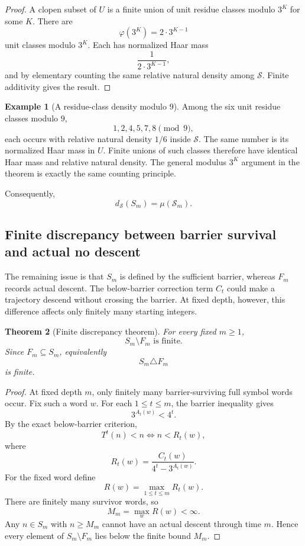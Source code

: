 \documentclass[11pt]{article}
\newtheorem{theorem}{Theorem}[section]
\theoremstyle{definition}
\newtheorem{example}[theorem]{Example}
\theoremstyle{remark}
\newcommand{\Sset}{\mathcal S}
\newcommand{\ds}{d_{\Sset}}
\begin{document}
\begin{proof}
A clopen subset of $U$ is a finite union of unit residue classes modulo $3^K$ for some $K$.  There are
\[
\varphi(3^K)=2\cdot3^{K-1}
\]
unit classes modulo $3^K$.  Each has normalized Haar mass
\[
\frac{1}{2\cdot3^{K-1}},
\]
and by elementary counting the same relative natural density among $\Sset$.  Finite additivity gives the result.
\end{proof}

\begin{example}[A residue-class density modulo $9$]
Among the six unit residue classes modulo $9$,
\[
1,2,4,5,7,8\pmod 9,
\]
each occurs with relative natural density $1/6$ inside $\Sset$.  The same
number is its normalized Haar mass in $U$.  Finite unions of such classes
therefore have identical Haar mass and relative natural density.  The general
modulus $3^K$ argument in the theorem is exactly the same counting principle.
\end{example}

Consequently,
\begin{equation}
\ds(S_m)=\mu(\mathcal S_m).
\label{eq:Sm-density}
\end{equation}

\subsection{Finite discrepancy between barrier survival and actual no descent}

The remaining issue is that $S_m$ is defined by the sufficient barrier, whereas $F_m$ records actual descent.  The below-barrier correction term $C_t$ could make a trajectory descend without crossing the barrier.  At fixed depth, however, this difference affects only finitely many starting integers.

\begin{theorem}[Finite discrepancy theorem]
For every fixed $m\ge1$,
\begin{equation}
\boxed{S_m\setminus F_m\text{ is finite}.}
\label{eq:finite-discrepancy}
\end{equation}
Since $F_m\subseteq S_m$, equivalently
\[
S_m\triangle F_m
\]
is finite.
\end{theorem}

\begin{proof}
At fixed depth $m$, only finitely many barrier-surviving full symbol words occur.  Fix such a word $w$.  For each $1\le t\le m$, the barrier inequality gives
\[
3^{A_t(w)}<4^t.
\]
By the exact below-barrier criterion,
\[
T^t(n)<n
\iff
n<R_t(w),
\]
where
\[
R_t(w)=\frac{C_t(w)}{4^t-3^{A_t(w)}}.
\]
For the fixed word define
\[
R(w)=\max_{1\le t\le m}R_t(w).
\]
There are finitely many survivor words, so
\[
M_m=\max_w R(w)<\infty.
\]
Any $n\in S_m$ with $n\ge M_m$ cannot have an actual descent through time $m$.  Hence every element of $S_m\setminus F_m$ lies below the finite bound $M_m$.
\end{proof}
\end{document}
